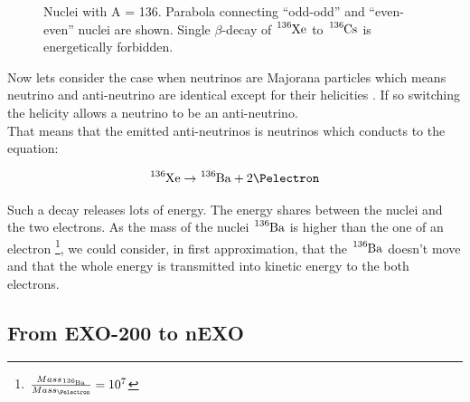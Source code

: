 \documentclass[a4paper, 11pt]{report}%
\begin{document}
  \newpage
  
  \begin{figure}[!hbtp]
  \centering
    \caption{Nuclei with A = 136. Parabola connecting ``odd-odd'' and ``even-even'' nuclei are shown. Single \(\beta\)-decay of 
    $\ce{^{136}Xe}$ to $\ce{^{136}Cs}$ is energetically forbidden.}
  \label{fig:even_even_nuclei}
  \end{figure}
  
  Now lets consider the case when neutrinos are Majorana particles which means neutrino and anti-neutrino are identical except 
  for their helicities \cite{ref:modern_particle_physics}. If so switching the helicity allows a neutrino to be an anti-neutrino.\\
  That means that the emitted anti-neutrinos is neutrinos which conducts to the equation:
  
  \begin{equation}
    \ce{^{136}Xe} \rightarrow \ce{^{136}Ba} + 2\Pelectron
  \end{equation}
  
  Such a decay releases lots of energy. The energy shares between the nuclei  and the two electrons. 
  As the mass of the nuclei $\ce{^{136}Ba}$ is higher than the one of an electron \footnote{$\frac{Mass_{\ce{^{136}Ba}}}{Mass_{\Pelectron}} = 10^{7}$}, 
  we could consider, in first approximation, that 
  the $\ce{^{136}Ba}$ doesn't move and that the whole energy is transmitted into kinetic energy to the both electrons. 

  \subsection{From EXO-200 to nEXO}
  
\end{document}
